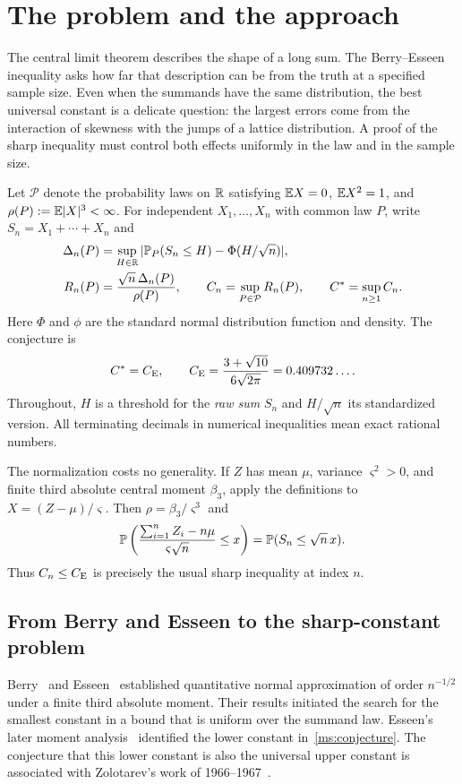\section{The problem and the approach}\label{ms:introduction}

The central limit theorem describes the shape of a long sum. The
Berry--Esseen inequality asks how far that description can be from the
truth at a specified sample size. Even when the summands have the same
distribution, the best universal constant is a delicate question: the
largest errors come from the interaction of skewness with the jumps of a
lattice distribution. A proof of the sharp inequality must control both
effects uniformly in the law and in the sample size.

Let $\mathcal P$ denote the probability laws on $\mathbb R$ satisfying
$\mathbb E X=0$, $\mathbb E X^2=1$, and $\rho(P):=\mathbb E|X|^3<\infty$. For independent
$X_1,\ldots,X_n$ with common law $P$, write $S_n=X_1+\cdots+X_n$ and
\begin{align*}
 \Delta_n(P)&=\sup_{H\in\mathbb R}
       |\mathbb P_P(S_n\le H)-\Phi(H/\sqrt n)|,\\
 R_n(P)&=\frac{\sqrt n\,\Delta_n(P)}{\rho(P)},\qquad
 C_n=\sup_{P\in\mathcal P}R_n(P),\qquad C^*=\sup_{n\ge1}C_n.
\end{align*}
Here $\Phi$ and $\phi$ are the standard normal distribution function and
density. The conjecture is
\begin{equation}\label{ms:conjecture}
 C^*=C_{\mathrm E},\qquad
 C_{\mathrm E}=\frac{3+\sqrt{10}}{6\sqrt{2\pi}}=0.409732\ldots.
\end{equation}
Throughout, $H$ is a threshold for the \emph{raw sum} $S_n$ and
$H/\sqrt n$ its standardized version. All terminating decimals
in numerical inequalities mean exact rational numbers.

The normalization costs no generality. If $Z$ has mean $\mu$, variance
$\varsigma^2>0$, and finite third absolute central moment $\beta_3$, apply the
definitions to $X=(Z-\mu)/\varsigma$. Then $\rho=\beta_3/\varsigma^3$ and
\[
 \mathbb P\left(\frac{\sum_{i=1}^n Z_i-n\mu}{\varsigma\sqrt n}\le x\right)
 =\mathbb P(S_n\le\sqrt n\,x).
\]
Thus $C_n\le C_{\mathrm E}$ is precisely the usual sharp inequality at index $n$.

\subsection{From Berry and Esseen to the sharp-constant problem}\label{ms:history}

Berry~\cite{Berry1941} and Esseen~\cite{Esseen1942,Esseen1945}
established quantitative normal approximation of order $n^{-1/2}$ under
a finite third absolute moment. Their results initiated the search for
the smallest constant in a bound that is uniform over the summand law.
Esseen's later moment analysis~\cite{Esseen1956} identified the lower
constant in~\eqref{ms:conjecture}. The conjecture that this lower constant
is also the universal upper constant is associated with Zolotarev's work
of 1966--1967~\cite{Zolotarev1966,Zolotarev1967}.

